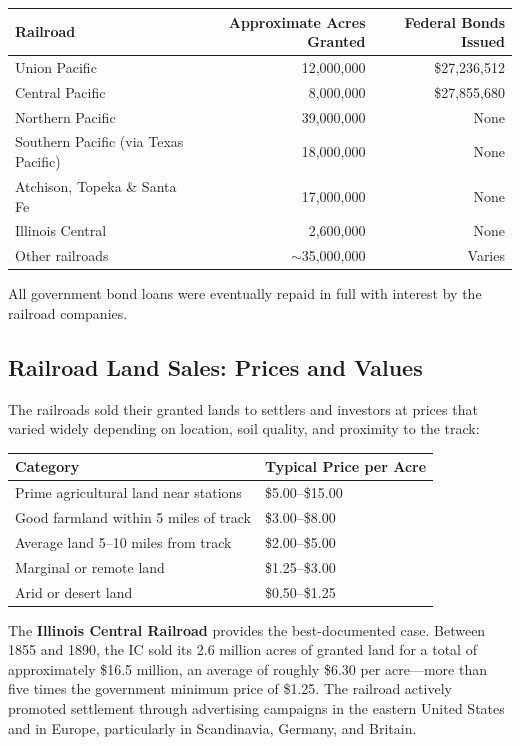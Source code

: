 \documentclass[12pt]{article}
\begin{document}
\begin{center}
\begin{tabular}{lrr}
\toprule
Railroad & Approximate Acres Granted & Federal Bonds Issued \\
\midrule
Union Pacific & 12,000,000 & \$27,236,512 \\
Central Pacific & 8,000,000 & \$27,855,680 \\
Northern Pacific & 39,000,000 & None \\
Southern Pacific (via Texas Pacific) & 18,000,000 & None \\
Atchison, Topeka \& Santa Fe & 17,000,000 & None \\
Illinois Central & 2,600,000 & None \\
Other railroads & $\sim$35,000,000 & Varies \\
\bottomrule
\end{tabular}
\end{center}

All government bond loans were eventually repaid in full with interest by the railroad companies.

\subsection{Railroad Land Sales: Prices and Values}

The railroads sold their granted lands to settlers and investors at prices that varied widely depending on location, soil quality, and proximity to the track:

\begin{center}
\begin{tabular}{ll}
\toprule
Category & Typical Price per Acre \\
\midrule
Prime agricultural land near stations & \$5.00--\$15.00 \\
Good farmland within 5 miles of track & \$3.00--\$8.00 \\
Average land 5--10 miles from track & \$2.00--\$5.00 \\
Marginal or remote land & \$1.25--\$3.00 \\
Arid or desert land & \$0.50--\$1.25 \\
\bottomrule
\end{tabular}
\end{center}

The \textbf{Illinois Central Railroad} provides the best-documented case.  Between 1855 and 1890, the IC sold its 2.6 million acres of granted land for a total of approximately \$16.5 million, an average of roughly \$6.30 per acre---more than five times the government minimum price of \$1.25.  The railroad actively promoted settlement through advertising campaigns in the eastern United States and in Europe, particularly in Scandinavia, Germany, and Britain.
\end{document}
